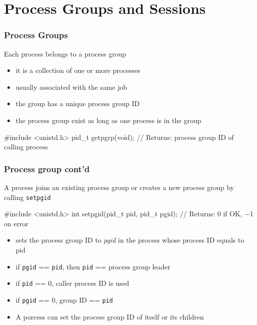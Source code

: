 \documentclass[newPxFont,sthlmFooter,nooffset]{beamer}
\begin{document}
\section{Process Groups and Sessions}

\begin{frame}[containsverbatim,t]
  \frametitle{Process Groups}
Each process belongs to a process group
\begin{itemize}
\item it is a collection of one or more processes
\item usually associated with the same job
\item the group has a unique process group ID
\item the process group exist as long as one process is in the group
\end{itemize}

\begin{codedef}
#include <unistd.h>
pid_t getpgrp(void);
// Returns: process group ID of calling process
\end{codedef}

\end{frame}

\begin{frame}[containsverbatim,t]
  \frametitle{Process group cont'd}
A process joins an existing process group or creates a new process group by calling \texttt{setpgid}
\begin{codedef}
#include <unistd.h>
int setpgid(pid_t pid, pid_t pgid);
// Returns: 0 if OK, −1 on error
\end{codedef}

\begin{itemize}
\item sets the process group ID to \textit{pgid} in the process whose process ID equals to pid
\item if \texttt{pgid} == \texttt{pid}, then \texttt{pid} == process group leader
\item if \texttt{pid} == 0, caller process ID is used
\item if \texttt{pgid} == 0, group ID == \texttt{pid}
\item A porcess can set the process group ID of itself or its children
\end{itemize}
\end{frame}
\end{document}
